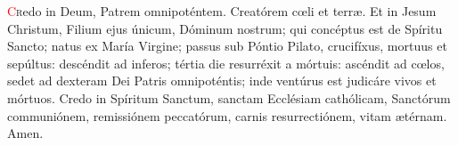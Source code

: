 \lettrine[lines=2]{\textcolor{red}{C}}redo in Deum, Patrem omnipoténtem. Creatórem c{\oe}li et terr{\ae}. Et in Jesum Christum, Filium ejus únicum, Dóminum nostrum; 
qui concéptus est de Spíritu Sancto; natus ex María Virgine; passus sub Póntio Pilato, crucifíxus, mortuus et sepúltus:
descéndit ad inferos; tértia die resurréxit a mórtuis: ascéndit ad c{\oe}los, sedet ad dexteram Dei Patris omnipoténtis;
inde ventúrus est judicáre vivos et mórtuos. Credo in Spíritum Sanctum, sanctam Ecclésiam cathólicam, Sanctórum communiónem,
remissiónem peccatórum, carnis resurrectiónem, vitam {\ae}térnam. Amen.